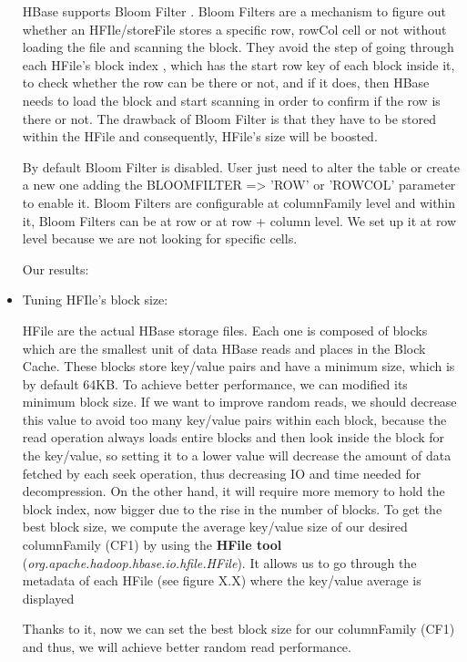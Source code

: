 \begin{itemize}
HBase supports Bloom Filter \cite{BloomFilter http://en.wikipedia.org/wiki/Bloom_filter}. Bloom Filters are a mechanism to figure out whether an HFIle/storeFile stores a specific row, rowCol cell or not without loading the file and scanning the block. They avoid the step of going through each HFile's block index , which has the start row key of each block inside it, to check whether the row can be there or not, and if it does, then HBase needs to load the block and start scanning in order to confirm if the row is there or not. The drawback of Bloom Filter is that they have to be stored within the HFile and consequently, HFile's size will be boosted. 
\par
By default Bloom Filter is disabled. User just need to alter the table or create a new one adding the BLOOMFILTER => 'ROW' or 'ROWCOL' parameter to enable it. Bloom Filters are configurable at columnFamily level and within it, Bloom Filters can be at row or at row + column level. We set up it at row level because we are not looking for specific cells.
\bigskip

Our results:




\item Tuning HFIle's block size:
\par
HFile are the actual HBase storage files. Each one is composed of blocks which are the smallest unit of data HBase reads and places in the Block Cache. These blocks store key/value pairs and have a minimum size, which is by default 64KB. To achieve better performance, we can modified its minimum block size. If we want to improve random reads, we should decrease this value to avoid too many key/value pairs within each block, because the read operation always loads entire blocks and then look inside the block for the key/value, so setting it to a lower value will decrease the amount of data fetched by each seek operation, thus decreasing IO and time needed for decompression. On the other hand, it will require more memory to hold the block index, now bigger due to the rise in the number of blocks.
\bigskip
To get the best block size, we compute the average key/value size of our desired columnFamily (CF1) by using the \textbf{HFile tool} (\textit{org.apache.hadoop.hbase.io.hfile.HFile}). It allows us to go through the metadata of each HFile (see figure X.X) where the key/value average is displayed

\bigskip
{}
\bigskip

Thanks to it, now we can set the best block size for our columnFamily (CF1) and thus, we will achieve better random read performance.

 


\end{itemize}

